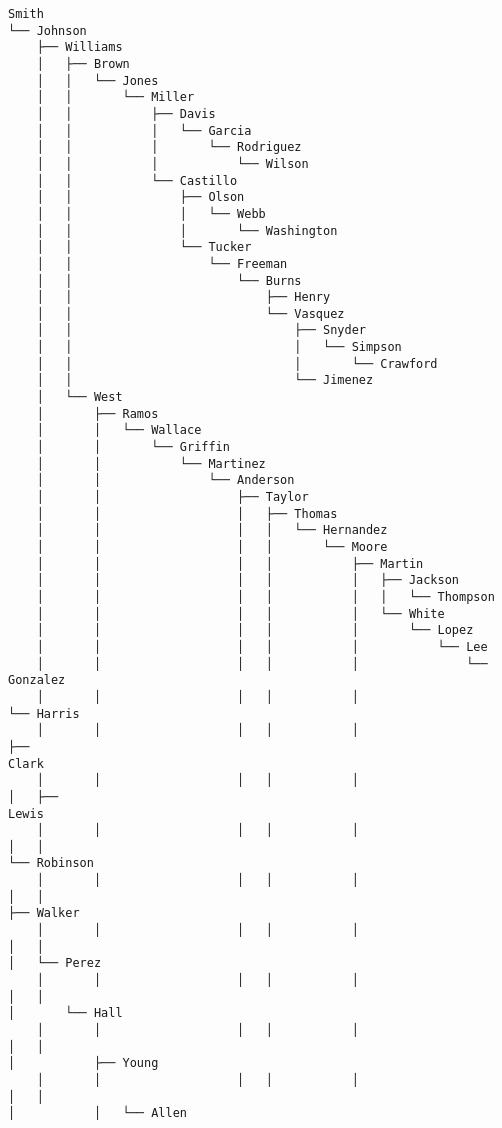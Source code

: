 \documentclass[11pt]{article}
\begin{document}
    \begin{Verbatim}[commandchars=\\\{\}]
Smith
└── Johnson
    ├── Williams
    │   ├── Brown
    │   │   └── Jones
    │   │       └── Miller
    │   │           ├── Davis
    │   │           │   └── Garcia
    │   │           │       └── Rodriguez
    │   │           │           └── Wilson
    │   │           └── Castillo
    │   │               ├── Olson
    │   │               │   └── Webb
    │   │               │       └── Washington
    │   │               └── Tucker
    │   │                   └── Freeman
    │   │                       └── Burns
    │   │                           ├── Henry
    │   │                           └── Vasquez
    │   │                               ├── Snyder
    │   │                               │   └── Simpson
    │   │                               │       └── Crawford
    │   │                               └── Jimenez
    │   └── West
    │       ├── Ramos
    │       │   └── Wallace
    │       │       └── Griffin
    │       │           └── Martinez
    │       │               └── Anderson
    │       │                   ├── Taylor
    │       │                   │   ├── Thomas
    │       │                   │   │   └── Hernandez
    │       │                   │   │       └── Moore
    │       │                   │   │           ├── Martin
    │       │                   │   │           │   ├── Jackson
    │       │                   │   │           │   │   └── Thompson
    │       │                   │   │           │   └── White
    │       │                   │   │           │       └── Lopez
    │       │                   │   │           │           └── Lee
    │       │                   │   │           │               └── Gonzalez
    │       │                   │   │           │                   └── Harris
    │       │                   │   │           │                       ├──
Clark
    │       │                   │   │           │                       │   ├──
Lewis
    │       │                   │   │           │                       │   │
└── Robinson
    │       │                   │   │           │                       │   │
├── Walker
    │       │                   │   │           │                       │   │
│   └── Perez
    │       │                   │   │           │                       │   │
│       └── Hall
    │       │                   │   │           │                       │   │
│           ├── Young
    │       │                   │   │           │                       │   │
│           │   └── Allen

\end{Verbatim}
\end{document}

